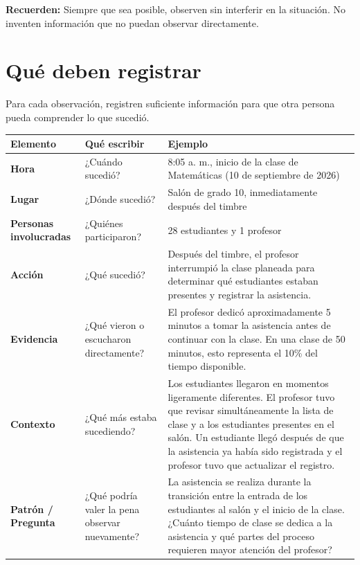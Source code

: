 \documentclass[12pt,a4paper]{article}
\begin{document}
	\vspace{0.2cm}
	
	\textbf{Recuerden:} Siempre que sea posible, observen sin interferir en la situación. No inventen información que no puedan observar directamente.
	
	\section*{Qué deben registrar}
	
	Para cada observación, registren suficiente información para que otra persona pueda comprender lo que sucedió.
	
	\begin{center}
		\small
		\begin{tabular}{|L{0.17\textwidth}|L{0.24\textwidth}|L{0.46\textwidth}|}
			\hline
			\textbf{Elemento} & \textbf{Qué escribir} & \textbf{Ejemplo} \\
			\hline
			\textbf{Hora} & ¿Cuándo sucedió? 
			& 8:05 a. m., inicio de la clase de Matemáticas (10 de septiembre de 2026) \\
			\hline
			\textbf{Lugar} & ¿Dónde sucedió? 
			& Salón de grado 10, inmediatamente después del timbre \\
			\hline
			\textbf{Personas involucradas} & ¿Quiénes participaron? 
			& 28 estudiantes y 1 profesor \\
			\hline
			\textbf{Acción} & ¿Qué sucedió? 
			& Después del timbre, el profesor interrumpió la clase planeada para determinar qué estudiantes estaban presentes y registrar la asistencia. \\
			\hline
			\textbf{Evidencia} & ¿Qué vieron o escucharon directamente? 
			& El profesor dedicó aproximadamente 5 minutos a tomar la asistencia antes de continuar con la clase. En una clase de 50 minutos, esto representa el 10\% del tiempo disponible. \\
			\hline
			\textbf{Contexto} & ¿Qué más estaba sucediendo? 
			& Los estudiantes llegaron en momentos ligeramente diferentes. El profesor tuvo que revisar simultáneamente la lista de clase y a los estudiantes presentes en el salón. Un estudiante llegó después de que la asistencia ya había sido registrada y el profesor tuvo que actualizar el registro. \\
			\hline
			\textbf{Patrón / Pregunta} & ¿Qué podría valer la pena observar nuevamente? 
			& La asistencia se realiza durante la transición entre la entrada de los estudiantes al salón y el inicio de la clase. ¿Cuánto tiempo de clase se dedica a la asistencia y qué partes del proceso requieren mayor atención del profesor? \\
			\hline
		\end{tabular}
	\end{center}
	
\end{document}
